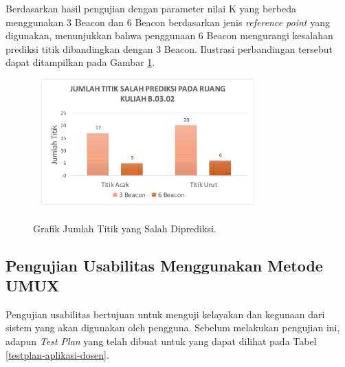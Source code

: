 \begin{enumerate}[a.]
\begin{enumerate}
	      \par Berdasarkan hasil pengujian dengan parameter nilai K yang berbeda menggunakan 3 Beacon dan 6 Beacon berdasarkan jenis \textit{reference point} yang digunakan, menunjukkan bahwa penggunaan 6 Beacon mengurangi kesalahan prediksi titik dibandingkan dengan 3 Beacon. Ilustrasi perbandingan tersebut dapat ditampilkan pada Gambar \ref{gambar-grafik-titik-salah-prediksi}.
	      \begin{figure}[H]
		      \center
		      \shadowbox
		      {\includegraphics [width = 9cm, height= 5cm]{gambar/pengujian/grafik-titik-salah-prediksi}}
		      \caption{Grafik Jumlah Titik yang Salah Diprediksi.}
		      \label{gambar-grafik-titik-salah-prediksi}
	      \end{figure}


\end{enumerate}

\subsection{Pengujian Usabilitas Menggunakan Metode UMUX}
\par Pengujian usabilitas bertujuan untuk menguji kelayakan dan kegunaan dari sistem yang akan digunakan oleh pengguna. Sebelum melakukan pengujian ini, adapun \textit{Test Plan} yang telah dibuat untuk yang dapat dilihat pada Tabel \ref{testplan-aplikasi-dosen}.


\end{enumerate}
